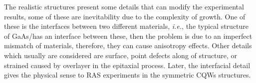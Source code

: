 The realistic structures present some details that can modify the experimental results, some of these are inevitability due to the complexity of growth. One of these is the interfaces between two different materials, \textit{i.e.}, the typical structure of GaAs/\algaas has an interface between these, then the problem is due to an imperfect mismatch of materials,
therefore, they can cause anisotropy effects. Other details which usually are considered are
surface, point defects along of structure, or strained caused by overlayer in the epitaxial
process. Later, the interfacial detail gives the physical sense to RAS experiments in the
symmetric \gls{CQWs} structures.
